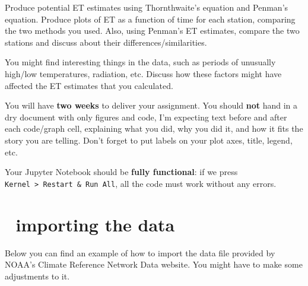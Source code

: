 \documentclass[
  letterpaper,
  DIV=11,
  numbers=noendperiod]{scrreprt}
\begin{document}
Produce potential ET estimates using Thornthwaite's equation and
Penman's equation. Produce plots of ET as a function of time for each
station, comparing the two methods you used. Also, using Penman's ET
estimates, compare the two stations and discuss about their
differences/similarities.

You might find interesting things in the data, such as periods of
unusually high/low temperatures, radiation, etc. Discuss how these
factors might have affected the ET estimates that you calculated.

You will have \textbf{two weeks} to deliver your assignment. You should
\textbf{not} hand in a dry document with only figures and code, I'm
expecting text before and after each code/graph cell, explaining what
you did, why you did it, and how it fits the story you are telling.
Don't forget to put labels on your plot axes, title, legend, etc.

Your Jupyter Notebook should be \textbf{fully functional}: if we press
\texttt{Kernel\ \textgreater{}\ Restart\ \&\ Run\ All}, all the code
must work without any errors.

\hypertarget{importing-the-data}{%
\section{🚚 importing the data}\label{importing-the-data}}

Below you can find an example of how to import the data file provided by
NOAA's Climate Reference Network Data website. You might have to make
some adjustments to it.
\end{document}
